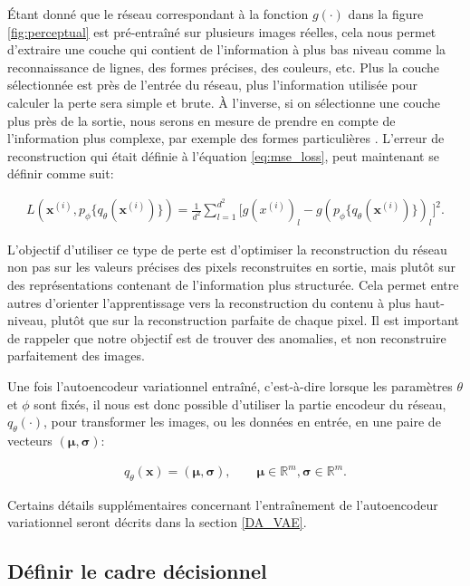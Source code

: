 Étant donné que le réseau correspondant à la fonction $g(\cdot)$ dans la figure \ref{fig:perceptual} est pré-entraîné sur plusieurs images réelles, cela nous permet d'extraire une couche qui contient de l'information à plus bas niveau comme la reconnaissance de lignes, des formes précises, des couleurs, etc. Plus la couche sélectionnée est près de l'entrée du réseau, plus l'information utilisée pour calculer la perte sera simple et brute. À l'inverse, si on sélectionne une couche plus près de la sortie, nous serons en mesure de prendre en compte de l'information plus complexe, par exemple des formes particulières \citep{Johnson2016Perceptual}. L'erreur de reconstruction qui était définie à l'équation \ref{eq:mse_loss}, peut maintenant se définir comme suit:

\begin{gather} \label{eq:perceptual_loss}
L(\boldsymbol{x}^{(i)}, p_\phi\{q_\theta(\boldsymbol{x}^{(i)})\}) = \frac{1}{d^2} \sum_{l=1}^{d^2} \Big[g(x^{(i)})_{l} - g(p_\phi\{q_\theta(\boldsymbol{x}^{(i)})\})_{l}\Big]^2.
\end{gather}

L'objectif d'utiliser ce type de perte est d'optimiser la reconstruction du réseau non pas sur les valeurs précises des pixels reconstruites en sortie, mais plutôt sur des représentations contenant de l'information plus structurée. Cela permet entre autres d'orienter l'apprentissage vers la reconstruction du contenu à plus haut-niveau, plutôt que sur la reconstruction parfaite de chaque pixel. Il est important de rappeler que notre objectif est de trouver des anomalies, et non reconstruire parfaitement des images.

Une fois l'autoencodeur variationnel entraîné, c'est-à-dire lorsque les paramètres $\theta$ et $\phi$ sont fixés, il nous est donc possible d'utiliser la partie encodeur du réseau, $q_{\theta}(\cdot) $, pour transformer les images, ou les données en entrée, en une paire de vecteurs $(\boldsymbol{\mu}, \boldsymbol{\sigma})$:

\begin{gather}  \label{eq:encodeur}
q_{\theta}(\boldsymbol{x}) = (\boldsymbol{\mu}, \boldsymbol{\sigma}), \qquad \boldsymbol{\mu} \in \mathbb{R}^m, \boldsymbol{\sigma} \in \mathbb{R}^m.
\end{gather}

Certains détails supplémentaires concernant l'entraînement de l'autoencodeur variationnel seront décrits dans la section \ref{DA_VAE}.


\subsection{Définir le cadre décisionnel} \label{cadre_decisionnel}

